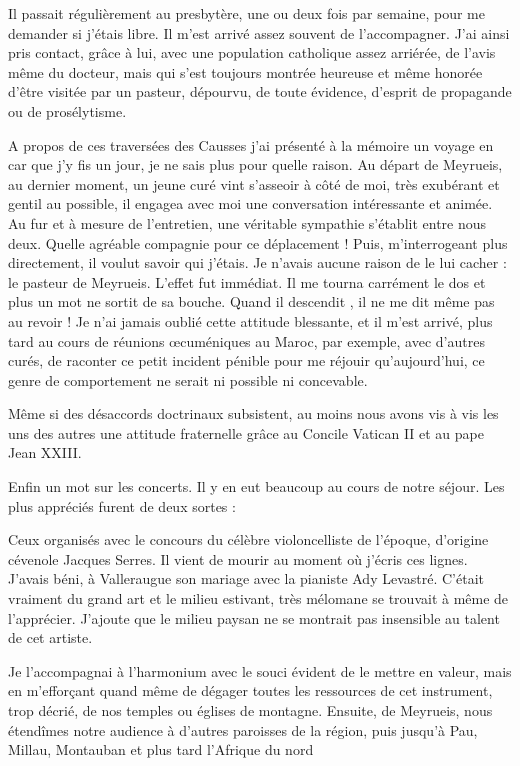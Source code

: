 
Il passait régulièrement au presbytère, une ou deux fois par semaine, pour me
demander si j’étais libre. Il m’est arrivé assez souvent de l’accompagner. J’ai ainsi
pris contact, grâce à lui, avec une population catholique assez arriérée, de l’avis
même du docteur, mais qui s’est toujours montrée heureuse et même honorée d’être
visitée par un pasteur, dépourvu, de toute évidence, d’esprit de propagande ou de
prosélytisme.

A propos de ces traversées des Causses j’ai présenté à la mémoire un voyage en car
que j’y fis un jour, je ne sais plus pour quelle raison. Au départ de Meyrueis, au
dernier moment, un jeune curé vint s’asseoir à côté de moi, très exubérant et gentil
au possible, il engagea avec moi une conversation intéressante et animée. Au fur et à
mesure de l’entretien, une véritable sympathie s’établit entre nous deux. Quelle
agréable compagnie pour ce déplacement ! Puis, m’interrogeant plus directement, il
voulut savoir qui j’étais. Je n’avais aucune raison de le lui cacher : le pasteur de
Meyrueis. L’effet fut immédiat. Il me tourna carrément le dos et plus un mot ne sortit
de sa bouche. Quand il descendit , il ne me dit même pas au revoir !
Je n’ai jamais oublié cette attitude blessante, et il m’est arrivé, plus tard au cours de
réunions œcuméniques au Maroc, par exemple, avec d’autres curés, de raconter ce
petit incident pénible pour me réjouir qu’aujourd’hui, ce genre de comportement ne
serait ni possible ni concevable.

Même si des désaccords doctrinaux subsistent, au moins nous avons vis à vis les uns
des autres une attitude fraternelle grâce au Concile Vatican II et au pape Jean XXIII.

Enfin un mot sur les concerts. Il y en eut beaucoup au cours de notre séjour. Les plus
appréciés furent de deux sortes :

Ceux organisés avec le concours du célèbre violoncelliste de l’époque, d’origine
cévenole Jacques Serres. Il vient de mourir au moment où j’écris ces lignes. J’avais
béni, à Valleraugue son mariage avec la pianiste Ady Levastré. C’était vraiment du
grand art et le milieu estivant, très mélomane se trouvait à même de l’apprécier.
J’ajoute que le milieu paysan ne se montrait pas insensible au talent de cet artiste.

Je l’accompagnai à l’harmonium avec le souci évident de le mettre en valeur, mais en
m’efforçant quand même de dégager toutes les ressources de cet instrument, trop
décrié, de nos temples ou églises de montagne. Ensuite, de Meyrueis, nous étendîmes
notre audience à d’autres paroisses de la région, puis jusqu’à Pau, Millau, Montauban
et plus tard l’Afrique du nord

